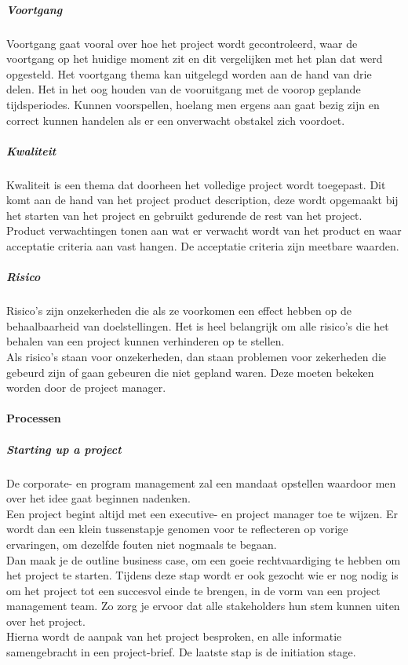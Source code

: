 \documentclass[]{article}
\begin{document}
\subparagraph{Voortgang}
Voortgang gaat vooral over hoe het project wordt gecontroleerd, waar de voortgang op het huidige moment zit en dit vergelijken met het plan dat werd opgesteld. Het voortgang thema kan uitgelegd worden aan de hand van drie delen. Het in het oog houden van de vooruitgang met de voorop geplande tijdsperiodes. Kunnen voorspellen, hoelang men ergens aan gaat bezig zijn en correct kunnen handelen als er een onverwacht obstakel zich voordoet.

\subparagraph{Kwaliteit}
Kwaliteit is een thema dat doorheen het volledige project wordt toegepast. Dit komt aan de hand van het project product description, deze wordt opgemaakt bij het starten van het project en gebruikt gedurende de rest van het project.\\
Product verwachtingen tonen aan wat er verwacht wordt van het product en waar acceptatie criteria aan vast hangen. De acceptatie criteria zijn meetbare waarden.

\subparagraph{Risico}
Risico's zijn onzekerheden die als ze voorkomen een effect hebben op de behaalbaarheid van doelstellingen. Het is heel belangrijk om alle risico's die het behalen van een project kunnen verhinderen op te stellen. \\
Als risico's staan voor onzekerheden, dan staan problemen voor zekerheden die gebeurd zijn of gaan gebeuren die niet gepland waren. Deze moeten bekeken worden door de project manager.

\paragraph{Processen}

\subparagraph{Starting up a project}
De corporate- en program management zal een mandaat opstellen waardoor men over het idee gaat beginnen nadenken. \\
Een project begint altijd met een executive- en project manager toe te wijzen. Er wordt dan een klein tussenstapje genomen voor te reflecteren op vorige ervaringen, om dezelfde fouten niet nogmaals te begaan. \\
Dan maak je de outline business case, om een goeie rechtvaardiging te hebben om het project te starten. Tijdens deze stap wordt er ook gezocht wie er nog nodig is om het project tot een succesvol einde te brengen, in de vorm van een project management team. Zo zorg je ervoor dat alle stakeholders hun stem kunnen uiten over het project. \\
Hierna wordt de aanpak van het project besproken, en alle informatie samengebracht in een project-brief.
De laatste stap is de initiation stage.
\end{document}
